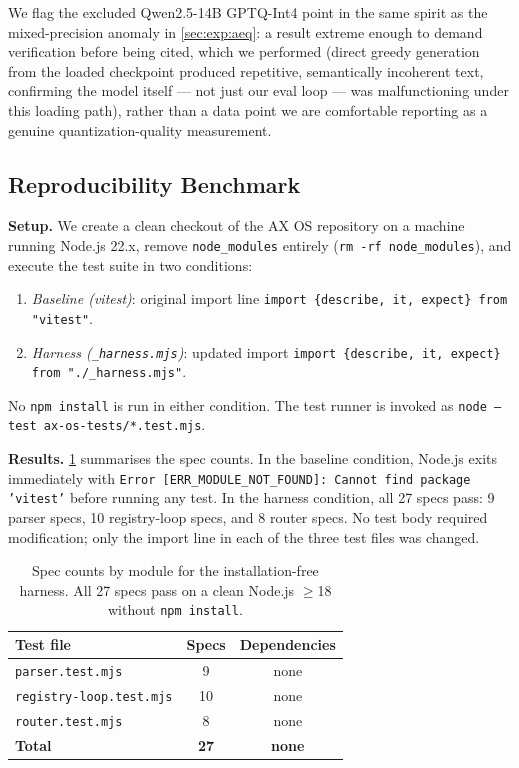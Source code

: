 \documentclass[10pt,twocolumn]{article}
\begin{document}
We flag the excluded Qwen2.5-14B GPTQ-Int4 point in the same spirit as the
mixed-precision anomaly in \cref{sec:exp:aeq}: a result extreme enough to
demand verification before being cited, which we performed (direct greedy
generation from the loaded checkpoint produced repetitive, semantically
incoherent text, confirming the model itself --- not just our eval loop ---
was malfunctioning under this loading path), rather than a data point we are
comfortable reporting as a genuine quantization-quality measurement.

\subsection{Reproducibility Benchmark}
\label{sec:exp:repro}

\textbf{Setup.}  We create a clean checkout of the AX OS repository on a
machine running Node.js 22.x, remove \texttt{node\_modules} entirely
(\texttt{rm -rf node\_modules}), and execute the test suite in two conditions:

\begin{enumerate}
  \item \emph{Baseline (vitest)}: original import line
    \texttt{import \{describe, it, expect\} from "vitest"}.
  \item \emph{Harness (\texttt{\_harness.mjs})}: updated import
    \texttt{import \{describe, it, expect\} from "./\_harness.mjs"}.
\end{enumerate}

No \texttt{npm install} is run in either condition.  The test runner is
invoked as \texttt{node --test ax-os-tests/*.test.mjs}.

\textbf{Results.}  \cref{tab:harness} summarises the spec counts.  In the
baseline condition, Node.js exits immediately with
\texttt{Error [ERR\_MODULE\_NOT\_FOUND]: Cannot find package 'vitest'} before
running any test.  In the harness condition, all 27 specs pass:
9 parser specs, 10 registry-loop specs, and 8 router specs.  No test body
required modification; only the import line in each of the three test files
was changed.

\begin{table}[t]
  \centering
  \caption{Spec counts by module for the installation-free harness.
    All 27 specs pass on a clean Node.js $\geq$18 without \texttt{npm install}.}
  \label{tab:harness}
  \begin{tabular}{lcc}
    \toprule
    Test file & Specs & Dependencies \\
    \midrule
    \texttt{parser.test.mjs}         &  9 & none \\
    \texttt{registry-loop.test.mjs}  & 10 & none \\
    \texttt{router.test.mjs}         &  8 & none \\
    \midrule
    \textbf{Total}                   & \textbf{27} & \textbf{none} \\
    \bottomrule
  \end{tabular}
\end{table}
\end{document}
